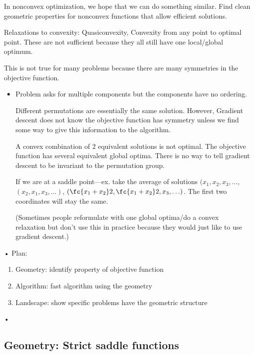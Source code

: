 In nonconvex optimization, we hope that we can do something similar. Find clean geometric properties for nonconvex functions that allow efficient solutions.

Relaxations to convexity: Quasiconvexity, Convexity from any point to optimal point. These are not sufficient because they all still have one local/global optimum.

This is not true for many problems because there are many symmetries in the objective function. 
\begin{itemize}
\item
Problem asks for multiple components but the components have no ordering. 

Different permutations are essentially the same solution.
However, Gradient descent does not know the objective function has symmetry unless we find some way to give this information to the algorithm.

A convex combination of 2 equivalent solutions is not optimal. The objective function has several equivalent global optima. 
There is no way to tell gradient descent to be invariant to the permutation group.

If we are at a saddle point---ex. take the average of solutions $(x_1,x_2,x_3,\ldots$, $(x_2,x_1,x_3,\ldots)$, $(\fc{x_1+x_2}2,\fc{x_1+x_2}2,x_3,\ldots)$. The first two coordinates will stay the same.

(Sometimes people reformulate with one global optima/do a convex relaxation but don't use this in practice because they would just like to use gradient descent.) 
\end{itemize}•
Plan:
\begin{enumerate}
\item
Geometry: identify property of objective function
\item
Algorithm: fast algorithm using the geometry
\item
Landscape: show specific problems have the geometric structure
\end{enumerate}•
\subsection{Geometry: Strict saddle functions}

